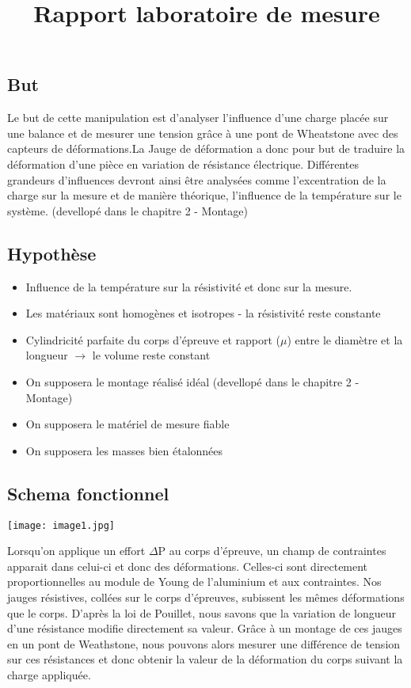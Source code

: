 \documentclass[10pt,a4paper]{report}
\begin{document}
\title{Rapport laboratoire de mesure}
\chapter{}
\section{But}
Le but de cette manipulation est d'analyser l'influence d'une charge placée sur une balance et de mesurer une tension grâce à une pont de Wheatstone avec des capteurs de déformations.La Jauge de déformation a donc pour but de traduire la déformation d'une pièce en variation de résistance électrique. Différentes grandeurs d'influences devront ainsi être analysées comme l'excentration de la charge sur la mesure et de manière théorique, l'influence de la température sur le système. (devellopé dans le chapitre 2 - Montage)

\section{Hypothèse}
\begin{itemize}
\item Influence de la température sur la résistivité et donc sur la mesure.
\item Les matériaux sont homogènes et isotropes - la résistivité reste constante
\item Cylindricité parfaite du corps d'épreuve et rapport ($\mu$) entre le diamètre et la longueur $\rightarrow$ le volume reste constant
\item On supposera le montage réalisé idéal (devellopé dans le chapitre 2 - Montage)
\item On supposera le matériel de mesure fiable
\item On supposera les masses bien étalonnées
\end{itemize}	

\section{Schema fonctionnel}
\begin{center}
\texttt{[image: image1.jpg]} 
\end{center}

Lorsqu'on applique un effort $\Delta$P au corps d'épreuve, un champ de contraintes apparait dans celui-ci et donc des déformations. Celles-ci sont directement proportionnelles au module de Young de l'aluminium et aux contraintes. Nos jauges résistives, collées sur le corps d'épreuves, subissent les mêmes déformations que le corps. D'après la loi de Pouillet, nous savons que la variation de longueur d'une résistance modifie directement sa valeur. Grâce à un montage de ces jauges en un pont de Weathstone, nous pouvons alors mesurer une différence de tension sur ces résistances et donc obtenir la valeur de la déformation du corps suivant la charge appliquée.
\end{document}
